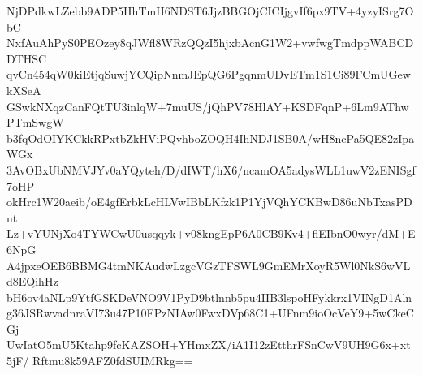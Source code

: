 NjDPdkwLZebb9ADP5HhTmH6NDST6JjzBBGOjCICIjgvIf6px9TV+4yzyISrg7ObC
NxfAuAhPyS0PEOzey8qJWfl8WRzQQzI5hjxbAcnG1W2+vwfwgTmdppWABCDDTHSC
qvCn454qW0kiEtjqSuwjYCQipNnmJEpQG6PgqnmUDvETm1S1Ci89FCmUGewkXSeA
GSwkNXqzCanFQtTU3inlqW+7muUS/jQhPV78HlAY+KSDFqnP+6Lm9AThwPTmSwgW
b3fqOdOIYKCkkRPxtbZkHViPQvhboZOQH4IhNDJ1SB0A/wH8ncPa5QE82zIpaWGx
3AvOBxUbNMVJYv0aYQyteh/D/dIWT/hX6/ncamOA5adysWLL1uwV2zENISgf7oHP
okHrc1W20aeib/oE4gfErbkLcHLVwIBbLKfzk1P1YjVQhYCKBwD86uNbTxasPDut
Lz+vYUNjXo4TYWCwU0usqqyk+v08kngEpP6A0CB9Kv4+flEIbnO0wyr/dM+E6NpG
A4jpxeOEB6BBMG4tmNKAudwLzgcVGzTFSWL9GmEMrXoyR5Wl0NkS6wVLd8EQihHz
bH6ov4aNLp9YtfGSKDeVNO9V1PyD9btlnnb5pu4IIB3lspoHFykkrx1VINgD1Aln
g36JSRwvadnraVI73u47P10FPzNIAw0FwxDVp68C1+UFnm9ioOcVeY9+5wCkeCGj
UwIatO5mU5Ktahp9fcKAZSOH+YHmxZX/iA1I12zEtthrFSnCwV9UH9G6x+xt5jF/
Rftmu8k59AFZ0fdSUIMRkg==
